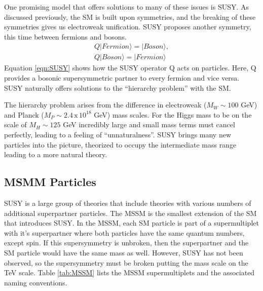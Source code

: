 	One promising model that offers solutions to many of these issues is \gls{SUSY}. As discussed previously, the \gls{SM} is built upon symmetries, and the breaking of these symmetries gives us electroweak unification. \gls{SUSY} proposes another symmetry, this time between fermions and bosons. 
	\begin{equation}\label{eqn:SUSY}
	\begin{split}
		Q | Fermion \rangle = | Boson \rangle, \\
		Q | Boson \rangle = | Fermion \rangle
	\end{split}
	\end{equation}
	Equation \ref{eqn:SUSY} shows how the \gls{SUSY} operator Q acts on particles. Here, Q provides a bosonic supersymmetric partner to every fermion and vice versa. \gls{SUSY} naturally offers solutions to the ``hierarchy problem'' with the \gls{SM}. 

	The hierarchy problem arises from the difference in electroweak ($M_W\sim100$ GeV)  and Planck ($M_P\sim2.4\, \mathrm{x} \, 10^{18}$ GeV) mass scales. For the Higgs mass to be on the scale of $M_H \sim 125$ GeV incredibly large and small mass terms must cancel perfectly, leading to a feeling of ``unnaturalness''. \gls{SUSY} brings many new particles into the picture, theorized to occupy the intermediate mass range leading to a more natural theory.

	\subsection{MSMM Particles}\label{ssec:MSMM}
		\gls{SUSY} is a large group of theories that include theories with various numbers of additional superpartner particles. The \gls{MSSM} is the smallest extension of the \gls{SM} that introduces \gls{SUSY}. In the \gls{MSSM}, each \gls{SM} particle is part of a supermultiplet with it's superpartner where both particles have the same quantum numbers, except spin. If this supersymmetry is unbroken, then the superpartner and the \gls{SM} particle would have the same mass as well. However, \gls{SUSY} has not been observed, so the supersymmetry must be broken putting the mass scale on the TeV scale. Table \ref{tab:MSSM} lists the \gls{MSSM} supermultiplets and the associated naming conventions.

